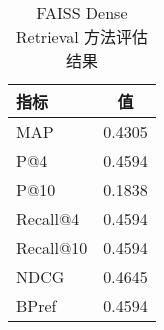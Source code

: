 \begin{table}[h]
\centering
\caption{FAISS Dense Retrieval 方法评估结果}
\begin{tabular}{|l|c|}
\hline
指标 & 值 \\
\hline
MAP & 0.4305 \\
P@4 & 0.4594 \\
P@10 & 0.1838 \\
Recall@4 & 0.4594 \\
Recall@10 & 0.4594 \\
NDCG & 0.4645 \\
BPref & 0.4594 \\
\hline
\end{tabular}
\end{table}
